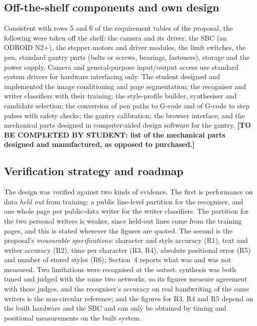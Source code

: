 \subsection{Off-the-shelf components and own design}
\label{sec:app-offshelf}

Consistent with rows 5 and 6 of the requirement tables of the proposal, the following were taken off the shelf: the camera and its driver, the SBC (an ODROID N2+), the stepper motors and driver modules, the limit switches, the pen, standard gantry parts (belts or screws, bearings, fasteners), storage and the power supply. Camera and general-purpose input/output access use standard system drivers for hardware interfacing only. The student designed and implemented the image conditioning and page segmentation; the recogniser and writer classifiers with their training; the style-profile builder, synthesiser and candidate selection; the conversion of pen paths to G-code and of G-code to step pulses with safety checks; the gantry calibration; the browser interface; and the mechanical parts designed in computer-aided design software for the gantry. \textbf{[TO BE COMPLETED BY STUDENT: list of the mechanical parts designed and manufactured, as opposed to purchased.]}

\subsection{Verification strategy and roadmap}
\label{sec:app-verification}

The design was verified against two kinds of evidence. The first is performance on data \emph{held out} from training: a public line-level partition for the recogniser, and one whole page per public-data writer for the writer classifiers. The partition for the two personal writers is weaker, since held-out lines come from the training pages, and this is stated wherever the figures are quoted. The second is the proposal's \emph{measurable specifications}: character and style accuracy (R1), text and writer accuracy (R2), time per character (R3, R4), absolute positional error (R5) and number of stored styles (R6); Section~4 reports what was and was not measured. Two limitations were recognised at the outset: synthesis was both tuned and judged with the same two networks, so its figures measure agreement with these judges, and the recogniser's accuracy on real handwriting of the same writers is the non-circular reference; and the figures for R3, R4 and R5 depend on the built hardware and the SBC and can only be obtained by timing and positional measurements on the built system.


